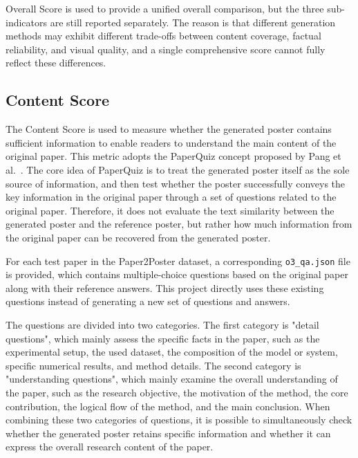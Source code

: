 \documentclass[12pt,oneside]{report}
\begin{document}
Overall Score is used to provide a unified overall comparison, but the three sub-indicators are still reported separately. The reason is that different generation methods may exhibit different trade-offs between content coverage, factual reliability, and visual quality, and a single comprehensive score cannot fully reflect these differences.

\subsection{Content Score}

The Content Score is used to measure whether the generated poster contains sufficient information to enable readers to understand the main content of the original paper. This metric adopts the PaperQuiz concept proposed by Pang et al.~\cite{paper2poster}. The core idea of PaperQuiz is to treat the generated poster itself as the sole source of information, and then test whether the poster successfully conveys the key information in the original paper through a set of questions related to the original paper. Therefore, it does not evaluate the text similarity between the generated poster and the reference poster, but rather how much information from the original paper can be recovered from the generated poster.

\vspace{1em}

For each test paper in the Paper2Poster dataset, a corresponding \texttt{o3\_qa.json} file is provided, which contains multiple-choice questions based on the original paper along with their reference answers. This project directly uses these existing questions instead of generating a new set of questions and answers.

\vspace{1em}

The questions are divided into two categories. The first category is "detail questions", which mainly assess the specific facts in the paper, such as the experimental setup, the used dataset, the composition of the model or system, specific numerical results, and method details. The second category is "understanding questions", which mainly examine the overall understanding of the paper, such as the research objective, the motivation of the method, the core contribution, the logical flow of the method, and the main conclusion. When combining these two categories of questions, it is possible to simultaneously check whether the generated poster retains specific information and whether it can express the overall research content of the paper.
\end{document}
